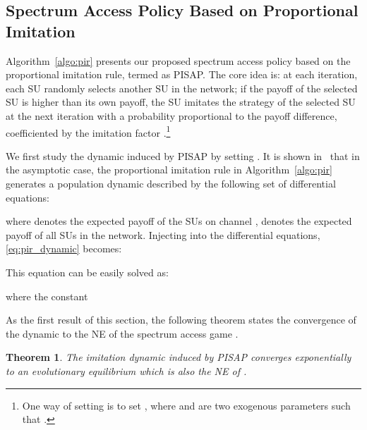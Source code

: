 \documentclass[12pt, onecolumn]{IEEEtran}
\theoremstyle{plain}
\newtheorem{theorem}{Theorem}
\theoremstyle{definition}
\begin{document}
\subsection{Spectrum Access Policy Based on Proportional Imitation}

Algorithm~\ref{algo:pir} presents our proposed spectrum access policy based on the proportional imitation rule, termed as PISAP. The core idea is:
at each iteration, each SU randomly selects another SU in the network; if the payoff of the selected SU is higher than its own payoff, the SU imitates the strategy of the selected SU at the next iteration with a probability proportional to the payoff difference, coefficiented by the imitation factor .\footnote{One way of setting  is to set , where  and  are two exogenous parameters such that .}

\begin{comment}

\begin{algorithm}
\caption{PISAP: executed at each SU }
\begin{algorithmic}[1]
\STATE \textbf{Initialization}: set the imitation factor  and the imitation threshold 
\STATE For the first iteration , randomly choose a channel to stay
\WHILE{at each iteration }
    \STATE Randomly select a SU 
    \IF{}
        \STATE Migrate to the channel  with probability 
    \ENDIF
\ENDWHILE
\end{algorithmic}
\label{algo:pir}
\end{algorithm}

\end{comment}

We first study the dynamic induced by PISAP by setting . It is shown in~\cite{Sand10} that in the asymptotic case, the proportional imitation rule in Algorithm~\ref{algo:pir} generates a population dynamic described by the following set of differential equations:

where  denotes the expected payoff of the SUs on channel ,  denotes the expected payoff of all SUs in the network. Injecting  into the differential equations, \eqref{eq:pir_dynamic} becomes:

This equation can be easily solved as:

where the constant


As the first result of this section, the following theorem states the convergence of the dynamic to the NE of the spectrum access game .

\begin{theorem}
\label{th:simple}
The imitation dynamic induced by PISAP converges exponentially to an evolutionary equilibrium which is also the NE of .
\end{theorem}
\end{document}
